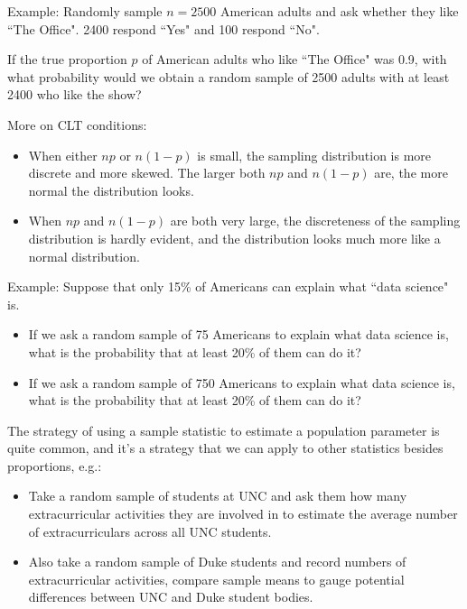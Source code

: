 \documentclass[11pt,letterpaper,twoside]{article}
\begin{document}
Example:  Randomly sample $n = 2500$ American adults and ask whether they like ``The Office".  2400 respond ``Yes" and 100 respond ``No". \vspace{120pt}

If the true proportion $p$ of American adults who like ``The Office" was 0.9, with what probability would we obtain a random sample of 2500 adults with at least 2400 who like the show?

\newpage

More on CLT conditions:

\begin{itemize}

\item When either $np$ or $n(1-p)$ is small, the sampling distribution is more discrete and more skewed. The larger both $np$ and $n(1-p)$ are, the more normal the distribution looks.

\item When $np$ and $n(1-p)$ are both very large, the discreteness of the sampling distribution is hardly evident, and the distribution looks much more like a normal distribution.

\end{itemize}

Example: Suppose that only 15\% of Americans can explain what ``data science" is.

\begin{itemize}

\item If we ask a random sample of 75 Americans to explain what data science is, what is the probability that at least 20\% of them can do it? \vspace{60pt}

\item If we ask a random sample of 750 Americans to explain what data science is, what is the probability that at least 20\% of them can do it? \vspace{180pt}

\end{itemize}

The strategy of using a sample statistic to estimate a population parameter is quite common, and it's a strategy that we can apply to other statistics besides proportions, e.g.:

\begin{itemize}

\item Take a random sample of students at UNC and ask them how many extracurricular activities they are involved in to estimate the average number of extracurriculars across all UNC students.

\item Also take a random sample of Duke students and record numbers of extracurricular activities, compare sample means to gauge potential differences between UNC and Duke student bodies.

\end{itemize}

\label{totalpag}
\end{document}
